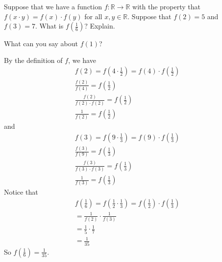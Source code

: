 \documentclass[12pt]{article}
\newenvironment{problem}[2][Problem]
{
	\begin{trivlist} 
		\item[\hskip \labelsep {\bfseries #1 #2:}]
	}
{
	\end{trivlist}
	}
\newenvironment{solution}[1][Solution]
{
	\begin{trivlist} 
		\item[\hskip \labelsep {\itshape #1:}]
	}
	{
	\end{trivlist}
}
\begin{document}
\newpage
\begin{problem}{3}
	Suppose that we have a function $f : \mathbb{R} \to \mathbb{R}$ with the property that $f(x \cdot y) = f(x) \cdot f(y)$ for all $x,y \in \mathbb{R}$. Suppose that $f(2)=5$ and $f(3) = 7$. What is $f(\frac{1}{6})$? Explain.
	
 What can you say about $f(1)$?

\begin{solution}
By the definition of $f$, we have
\begin{align*}
f(2)=f(4 \cdot \frac{1}{2})=f(4)\cdot f(\frac{1}{2})\\
\frac{f(2)}{f(4)}=f(\frac{1}{2})\\
\frac{f(2)}{f(2) \cdot f(2)}=f(\frac{1}{2})\\
\frac{1}{f(2)}=f(\frac{1}{2})
\end{align*}
and 
\begin{align*}
f(3)=f(9 \cdot \frac{1}{3})=f(9)\cdot f(\frac{1}{3})\\
\frac{f(3)}{f(9)}=f(\frac{1}{3})\\
\frac{f(3)}{f(3) \cdot f(3)}=f(\frac{1}{3})\\
\frac{1}{f(3)}=f(\frac{1}{3})
\end{align*}
Notice that
\begin{align*}
f(\frac{1}{6})=f(\frac{1}{2} \cdot \frac{1}{3})=f(\frac{1}{2})\cdot f(\frac{1}{3})\\
=\frac{1}{f(2)} \cdot \frac{1}{f(3)}\\
=\frac{1}{5} \cdot \frac{1}{7}\\
=\frac{1}{35}
\end{align*}
So $f(\frac{1}{6})=\frac{1}{35}$.
\end{solution}
\end{problem}
\end{document}
